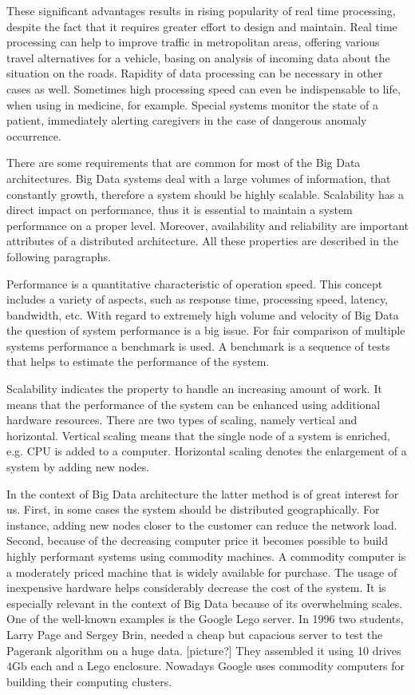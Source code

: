 These significant advantages results in rising popularity of real time processing, despite the fact that it requires greater effort to design and maintain.
Real time processing can help to improve traffic in metropolitan areas, offering various travel alternatives for a vehicle, basing on analysis of incoming data about the situation on the roads.
Rapidity of data processing can be necessary in other cases as well.
Sometimes high processing speed can even be indispensable to life, when using in medicine, for example.
Special systems monitor the state of a patient, immediately alerting caregivers in the case of dangerous anomaly occurrence. 

There are some requirements that are common for most of the Big Data architectures.
Big Data systems deal with a large volumes of information, that constantly growth, therefore a system should be highly scalable.
Scalability has a direct impact on performance, thus it is essential to maintain a system performance on a proper level.
Moreover, availability and reliability are important attributes of a distributed architecture.
All these properties are described in the following paragraphs.

Performance is a quantitative characteristic of operation speed.  
This concept includes a variety of aspects, such as response time, processing speed, latency, bandwidth, etc.
With regard to extremely high volume and velocity of Big Data the question of system performance is a big issue.
For fair comparison of multiple systems performance a benchmark is used.
A benchmark is a sequence of tests that helps to estimate the performance of the system.

Scalability indicates the property to handle an increasing amount of work.
It means that the performance of the system can be enhanced using additional hardware resources.
There are two types of scaling, namely vertical and horizontal.
Vertical scaling means that the single node of a system is enriched, e.g. CPU is added to a computer. 
Horizontal scaling denotes the enlargement of a system by adding new nodes.

In the context of Big Data architecture the latter method is of great interest for us.
First, in some cases the system should be distributed geographically.
For instance, adding new nodes closer to the customer can reduce the network load.
Second, because of the decreasing computer price it becomes possible to build highly performant systems using commodity machines.
A commodity computer is a moderately priced machine that is widely available for purchase.
The usage of inexpensive hardware helps considerably decrease the cost of the system.
It is especially relevant in the context of Big Data because of its overwhelming scales.
One of the well-known examples is the Google Lego server.
In 1996 two students, Larry Page and Sergey Brin, needed a cheap but capacious server to test the Pagerank algorithm on a huge data. 
[picture?]
They assembled it using 10 drives 4Gb each and a Lego enclosure. 
Nowadays Google uses commodity computers for building their computing clusters.

